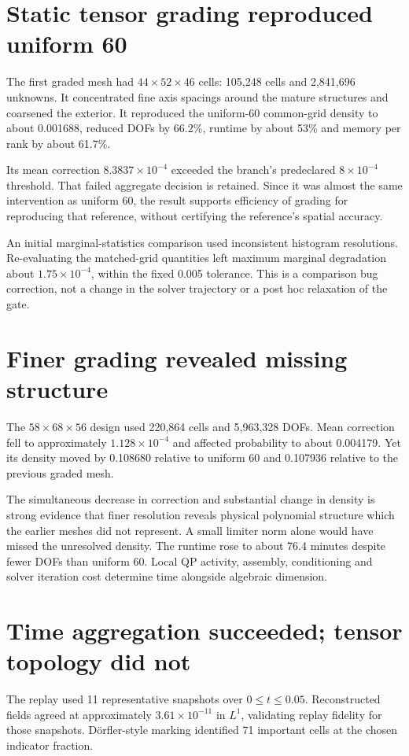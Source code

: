 \section{Static tensor grading reproduced uniform 60}
The first graded mesh had $44\times52\times46$ cells: 105,248 cells and 2,841,696 unknowns. It concentrated fine axis spacings around the mature structures and coarsened the exterior. It reproduced the uniform-60 common-grid density to about 0.001688, reduced DOFs by 66.2\%, runtime by about 53\% and memory per rank by about 61.7\%.

Its mean correction $8.3837\times10^{-4}$ exceeded the branch's predeclared $8\times10^{-4}$ threshold. That failed aggregate decision is retained. Since it was almost the same intervention as uniform 60, the result supports efficiency of grading for reproducing that reference, without certifying the reference's spatial accuracy.

An initial marginal-statistics comparison used inconsistent histogram resolutions. Re-evaluating the matched-grid quantities left maximum marginal degradation about $1.75\times10^{-4}$, within the fixed 0.005 tolerance. This is a comparison bug correction, not a change in the solver trajectory or a post hoc relaxation of the gate.

\section{Finer grading revealed missing structure}
The $58\times68\times56$ design used 220,864 cells and 5,963,328 DOFs. Mean correction fell to approximately $1.128\times10^{-4}$ and affected probability to about 0.004179. Yet its density moved by 0.108680 relative to uniform 60 and 0.107936 relative to the previous graded mesh.

The simultaneous decrease in correction and substantial change in density is strong evidence that finer resolution reveals physical polynomial structure which the earlier meshes did not represent. A small limiter norm alone would have missed the unresolved density. The runtime rose to about 76.4 minutes despite fewer DOFs than uniform 60. Local QP activity, assembly, conditioning and solver iteration cost determine time alongside algebraic dimension.

\section{Time aggregation succeeded; tensor topology did not}
The replay used 11 representative snapshots over $0\le t\le0.05$. Reconstructed fields agreed at approximately $3.61\times10^{-11}$ in $L^1$, validating replay fidelity for those snapshots. D\"orfler-style marking identified 71 important cells at the chosen indicator fraction.

